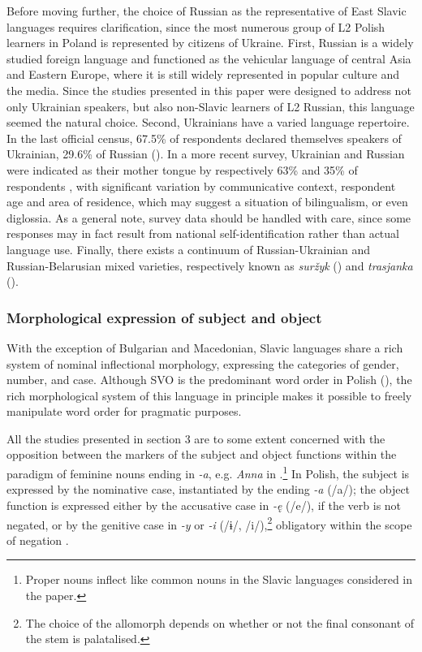 \documentclass[output=paper,            colorlinks, citecolor=brown            		  ]{langscibook}
\begin{document}
Before moving further, the choice of Russian as the representative of East Slavic languages requires clarification, since the most numerous group of L2 Polish learners in Poland is represented by citizens of Ukraine. First, Russian is a widely studied foreign language and functioned as the vehicular language of central Asia and Eastern Europe, where it is still widely represented in popular culture and the media. Since the studies presented in this paper were designed to address not only Ukrainian speakers, but also non-Slavic learners of L2 Russian, this language seemed the natural choice. Second, Ukrainians have a varied language repertoire. In the last official census, 67.5\% of respondents declared themselves speakers of Ukrainian, 29.6\% of Russian (\citealt{StateStatisticsCommitteeofUkraine2001}). In a more recent survey, Ukrainian and Russian were indicated as their mother tongue by respectively 63\% and 35\% of respondents \citep{Kantar2019}, with significant variation by communicative context, respondent age and area of residence, which may suggest a situation of bilingualism, or even diglossia. As a general note, survey data should be handled with care, since some responses may in fact result from national self-identification rather than actual language use. Finally, there exists a continuum of Russian-Ukrainian and Russian-Belarusian mixed varieties, respectively known as \textit{suržyk} (\citealt{Bilaniuk2004, Danylenko2016, DelGaudio2018}) and \textit{trasjanka} (\citealt{Woolhiser2014, Hentschel2017, DelGaudio2018}). 

\subsubsection{Morphological expression of subject and object}
\label{sec:saturno:2.2.1}
With the exception of Bulgarian and Macedonian, Slavic languages share a rich system of nominal inflectional morphology, expressing the categories of gender, number, and case. Although SVO is the predominant word order in Polish (\citealt{Siewierska1993, Dryer2013order}), the rich morphological system of this language in principle makes it possible to freely manipulate word order for pragmatic purposes. 

All the studies presented in section 3 are to some extent concerned with the opposition between the markers of the subject and object functions within the paradigm of feminine nouns ending in \textit{{}-a}, e.g. \textit{Anna} in .\footnote{Proper nouns inflect like common nouns in the Slavic languages considered in the paper.} In Polish, the subject is expressed by the nominative case, instantiated by the ending \textit{{}-a} (/a/); the object function is expressed either by the accusative case in \textit{{}-ę} (/e/), if the verb is not negated, or by the genitive case in \textit{{}-y} or \textit{-i} (/ɨ/, /i/),\footnote{The choice of the allomorph depends on whether or not the final consonant of the stem is palatalised.} obligatory within the scope of negation \citep{Przepiórkowski2000}.
\end{document}
